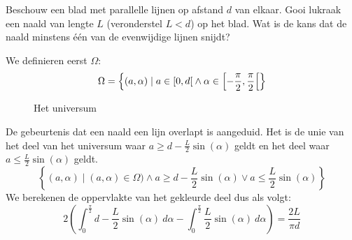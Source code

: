 \documentclass[main.tex]{subfiles}
\begin{document}
\begin{oef}
  Beschouw een blad met parallelle lijnen op afstand $d$ van elkaar.
  Gooi lukraak een naald van lengte $L$ (veronderstel $L < d$) op het blad.
  Wat is de kans dat de naald minstens \'e\'en van de evenwijdige lijnen snijdt?
  \begin{figure}[H]
    \centering
  \end{figure}
  We definieren eerst $\Omega$:
  \[ \Omega = \left\{ (a,\alpha) \mid a \in \interval[open right]{0}{d} \wedge \alpha \in \interval[scaled, open right]{-\frac{\pi}{2}}{ \frac{\pi}{2}} \right\} \]
  \begin{figure}[H]
    \centering
    \caption{Het universum}
  \end{figure}
  De gebeurtenis dat een naald een lijn overlapt is aangeduid.
  Het is de unie van het deel van het universum waar $a \ge d-\frac{L}{2}\sin(\alpha)$ geldt en het deel waar $a \le \frac{L}{2}\sin(\alpha)$ geldt.
  \[ \left\{ (a,\alpha) \mid (a, \alpha) \in \Omega) \wedge a \ge d-\frac{L}{2}\sin(\alpha) \vee a \le \frac{L}{2}\sin(\alpha) \right\}\]
  We berekenen de oppervlakte van het gekleurde deel dus als volgt:
  \[ 2\left(\int_{0}^{\frac{\pi}{2}} d-\frac{L}{2}\sin(\alpha)\ d\alpha- \int_{0}^{\frac{\pi}{2}}\frac{L}{2}\sin(\alpha)\ d\alpha \right) = \frac{2L}{\pi d} \]
\end{oef}
\end{document}
